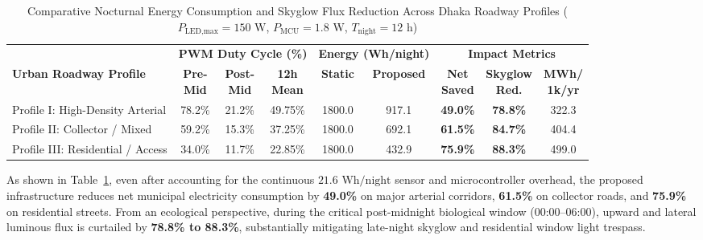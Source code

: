 \documentclass[11pt,a4paper]{article}
\begin{document}
\begin{table}[tbp]
\centering
\caption{Comparative Nocturnal Energy Consumption and Skyglow Flux Reduction Across Dhaka Roadway Profiles (\(P_{\text{LED,max}} = 150\text{ W}\), \(P_{\text{MCU}} = 1.8\text{ W}\), \(T_{\text{night}} = 12\text{ h}\))}
\label{tab:energy_savings}
\footnotesize
\setlength{\tabcolsep}{3pt}
\begin{tabularx}{\textwidth}{>{\raggedright\arraybackslash}X ccc cc ccc}
\toprule
& \multicolumn{3}{c}{\textbf{PWM Duty Cycle (\%)}} & \multicolumn{2}{c}{\textbf{Energy (Wh/night)}} & \multicolumn{3}{c}{\textbf{Impact Metrics}} \\
\cmidrule(lr){2-4} \cmidrule(lr){5-6} \cmidrule(lr){7-9}
\textbf{Urban Roadway Profile} & \makecell{\textbf{Pre-} \\ \textbf{Mid}} & \makecell{\textbf{Post-} \\ \textbf{Mid}} & \makecell{\textbf{12h} \\ \textbf{Mean}} & \textbf{Static} & \textbf{Proposed} & \makecell{\textbf{Net} \\ \textbf{Saved}} & \makecell{\textbf{Skyglow} \\ \textbf{Red.}} & \makecell{\textbf{MWh/} \\ \textbf{1k/yr}} \\
\midrule
Profile I: High-Density Arterial & 78.2\% & 21.2\% & 49.75\% & 1800.0 & 917.1 & \textbf{49.0\%} & \textbf{78.8\%} & 322.3 \\
Profile II: Collector / Mixed & 59.2\% & 15.3\% & 37.25\% & 1800.0 & 692.1 & \textbf{61.5\%} & \textbf{84.7\%} & 404.4 \\
Profile III: Residential / Access & 34.0\% & 11.7\% & 22.85\% & 1800.0 & 432.9 & \textbf{75.9\%} & \textbf{88.3\%} & 499.0 \\
\bottomrule
\end{tabularx}
\end{table}

As shown in Table~\ref{tab:energy_savings}, even after accounting for the continuous \(21.6\text{ Wh/night}\) sensor and microcontroller overhead, the proposed infrastructure reduces net municipal electricity consumption by \textbf{49.0\%} on major arterial corridors, \textbf{61.5\%} on collector roads, and \textbf{75.9\%} on residential streets. From an ecological perspective, during the critical post-midnight biological window (00:00--06:00), upward and lateral luminous flux is curtailed by \textbf{78.8\% to 88.3\%}, substantially mitigating late-night skyglow and residential window light trespass.
\end{document}

